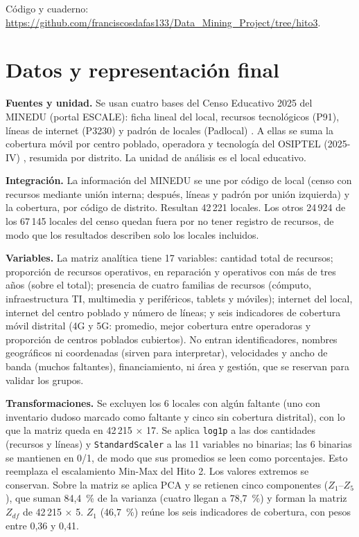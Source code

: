 \documentclass[conference]{IEEEtran}
\begin{document}
Código y cuaderno: \url{https://github.com/franciscosdafas133/Data_Mining_Project/tree/hito3}.

\section{Datos y representación final}
\textbf{Fuentes y unidad.} Se usan cuatro bases del Censo Educativo 2025 del MINEDU (portal ESCALE): ficha lineal del local, recursos tecnológicos (P91), líneas de internet (P3230) y padrón de locales (Padlocal) \cite{escale}. A ellas se suma la cobertura móvil por centro poblado, operadora y tecnología del OSIPTEL (2025-IV) \cite{osiptel}, resumida por distrito. La unidad de análisis es el local educativo.

\textbf{Integración.} La información del MINEDU se une por código de local (censo con recursos mediante unión interna; después, líneas y padrón por unión izquierda) y la cobertura, por código de distrito. Resultan 42\,221 locales. Los otros 24\,924 de los 67\,145 locales del censo quedan fuera por no tener registro de recursos, de modo que los resultados describen solo los locales incluidos.

\textbf{Variables.} La matriz analítica tiene 17 variables: cantidad total de recursos; proporción de recursos operativos, en reparación y operativos con más de tres años (sobre el total); presencia de cuatro familias de recursos (cómputo, infraestructura TI, multimedia y periféricos, tablets y móviles); internet del local, internet del centro poblado y número de líneas; y seis indicadores de cobertura móvil distrital (4G y 5G: promedio, mejor cobertura entre operadoras y proporción de centros poblados cubiertos). No entran identificadores, nombres geográficos ni coordenadas (sirven para interpretar), velocidades y ancho de banda (muchos faltantes), financiamiento, ni área y gestión, que se reservan para validar los grupos.

\textbf{Transformaciones.} Se excluyen los 6 locales con algún faltante (uno con inventario dudoso marcado como faltante y cinco sin cobertura distrital), con lo que la matriz queda en 42\,215 $\times$ 17. Se aplica \texttt{log1p} a las dos cantidades (recursos y líneas) y \texttt{StandardScaler} a las 11 variables no binarias; las 6 binarias se mantienen en 0/1, de modo que sus promedios se leen como porcentajes. Esto reemplaza el escalamiento Min-Max del Hito 2. Los valores extremos se conservan. Sobre la matriz se aplica PCA y se retienen cinco componentes ($Z_1$--$Z_5$), que suman 84,4~\% de la varianza (cuatro llegan a 78,7~\%) y forman la matriz $Z_{df}$ de 42\,215 $\times$ 5. $Z_1$ (46,7~\%) reúne los seis indicadores de cobertura, con pesos entre 0,36 y 0,41.
\end{document}
